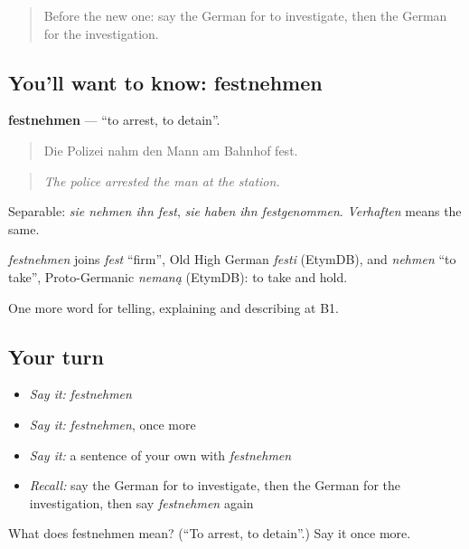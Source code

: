 \label{lesson:GE-C284-festnehmen}



\begin{quote}
Before the new one: say the German for to investigate, then the German for the investigation.
\end{quote}

\subsection*{You'll want to know: festnehmen}
\textbf{festnehmen} — \textquotedblleft{}to arrest, to detain\textquotedblright{}.

\begin{quote}
Die Polizei nahm den Mann am Bahnhof fest.
\end{quote}

\begin{quote}
\emph{The police arrested the man at the station.}
\end{quote}

Separable: \emph{sie nehmen ihn fest}, \emph{sie haben ihn festgenommen}. \emph{Verhaften} means the same.

\begin{cousinweb}
\emph{festnehmen} joins \emph{fest} \textquotedblleft{}firm\textquotedblright{}, Old High German \emph{festi} (EtymDB), and \emph{nehmen} \textquotedblleft{}to take\textquotedblright{}, Proto-Germanic \emph{nemaną} (EtymDB): to take and hold.
\end{cousinweb}

\begin{grammarlens}[title={What you've built}]
One more word for telling, explaining and describing at B1.
\end{grammarlens}

\subsection*{Your turn}
\begin{itemize}
\raggedright
  \item \emph{Say it:} \emph{festnehmen}
  \item \emph{Say it:} \emph{festnehmen}, once more
  \item \emph{Say it:} a sentence of your own with \emph{festnehmen}
  \item \emph{Recall:} say the German for to investigate, then the German for the investigation, then say \emph{festnehmen} again
\end{itemize}

\begin{tcolorbox}[breakable,colback=teal!4,colframe=teal!35!black,title={Before you move on}]
What does festnehmen mean? (\textquotedblleft{}To arrest, to detain\textquotedblright{}.) Say it once more.
\end{tcolorbox}
